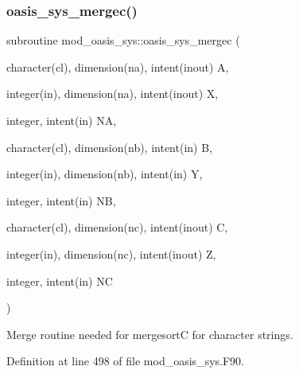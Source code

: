\subsubsection{\texorpdfstring{oasis\+\_\+sys\+\_\+mergec()}{oasis\_sys\_mergec()}}
{\footnotesize\ttfamily subroutine mod\+\_\+oasis\+\_\+sys\+::oasis\+\_\+sys\+\_\+mergec (\begin{DoxyParamCaption}\item[{character(cl), dimension(na), intent(inout)}]{A,  }\item[{integer(in), dimension(na), intent(inout)}]{X,  }\item[{integer, intent(in)}]{NA,  }\item[{character(cl), dimension(nb), intent(in)}]{B,  }\item[{integer(in), dimension(nb), intent(in)}]{Y,  }\item[{integer, intent(in)}]{NB,  }\item[{character(cl), dimension(nc), intent(inout)}]{C,  }\item[{integer(in), dimension(nc), intent(inout)}]{Z,  }\item[{integer, intent(in)}]{NC }\end{DoxyParamCaption})\hspace{0.3cm}{\ttfamily [private]}}



Merge routine needed for mergesortC for character strings. 



Definition at line 498 of file mod\+\_\+oasis\+\_\+sys.\+F90.

\mbox{\label{namespacemod__oasis__sys_a5384f02abfdf4a5cee0706ddefecde87}} 
